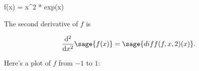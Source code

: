 \documentclass{article}
\begin{document}
\begin{sageblock}
  f(x) = x^2 * exp(x)
\end{sageblock}

The second derivative of $f$ is

\[
  \frac{\mathrm{d}^{2}}{\mathrm{d}x^{2}} \sage{f(x)} =
  \sage{diff(f, x, 2)(x)}.
\]

Here's a plot of $f$ from $-1$ to $1$:

\end{document}
